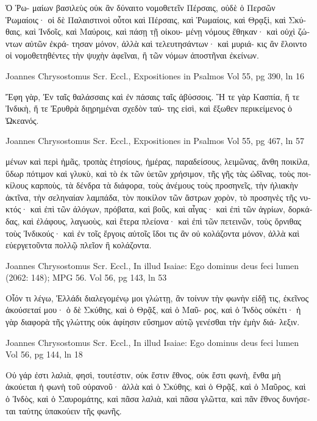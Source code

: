 \documentclass[12pt,letterpaper,twoside,final]{memoir}
\begin{document}
\begin{greek}
                                                Ὁ Ῥω-
μαίων βασιλεὺς οὐκ ἂν δύναιτο νομοθετεῖν Πέρσαις, 
οὐδὲ ὁ Περσῶν Ῥωμαίοις· οἱ δὲ Παλαιστινοὶ οὗτοι 
καὶ Πέρσαις, καὶ Ῥωμαίοις, καὶ Θρᾳξὶ, καὶ Σκύ-
θαις, καὶ Ἰνδοῖς, καὶ Μαύροις, καὶ πάσῃ τῇ οἰκου-
μένῃ νόμους ἔθηκαν· καὶ οὐχὶ ζώντων αὐτῶν ἐκρά-
τησαν μόνον, ἀλλὰ καὶ τελευτησάντων· καὶ μυριά-
κις ἂν ἕλοιντο οἱ νομοθετηθέντες τὴν ψυχὴν ἀφεῖναι, 
ἢ τῶν νόμων ἀποστῆναι ἐκείνων. 



Joannes Chrysostomus Scr. Eccl., Expositiones in Psalmos 
Vol 55, pg 390, ln 16

                  Ἔφη γὰρ, Ἐν ταῖς θαλάσσαις 
καὶ ἐν πάσαις ταῖς ἀβύσσοις. Ἥ τε γὰρ Κασπία, 
ἥ τε Ἰνδικὴ, ἥ τε Ἐρυθρὰ διῃρημέναι σχεδὸν ταύ-
της εἰσὶ, καὶ ἔξωθεν περικείμενος ὁ Ὠκεανός. 



Joannes Chrysostomus Scr. Eccl., Expositiones in Psalmos 
Vol 55, pg 467, ln 57

μένων καὶ περὶ ἡμᾶς, τροπὰς ἐτησίους, ἡμέρας, 
παραδείσους, λειμῶνας, ἄνθη ποικίλα, ὕδωρ πότιμον 
καὶ γλυκὺ, καὶ τὸ ἐκ τῶν ὑετῶν χρήσιμον, τῆς γῆς 
τὰς ὠδῖνας, τοὺς ποικίλους καρποὺς, τὰ δένδρα τὰ 
διάφορα, τοὺς ἀνέμους τοὺς προσηνεῖς, τὴν ἡλιακὴν 
ἀκτῖνα, τὴν σεληναίαν λαμπάδα, τὸν ποικίλον τῶν 
ἄστρων χορὸν, τὸ προσηνὲς τῆς νυκτός· καὶ ἐπὶ τῶν 
ἀλόγων, πρόβατα, καὶ βοῦς, καὶ αἶγας· καὶ ἐπὶ τῶν 
ἀγρίων, δορκάδας, καὶ ἐλάφους, λαγωοὺς, καὶ ἕτερα 
πλείονα· καὶ ἐπὶ τῶν πετεινῶν, τοὺς ὄρνιθας τοὺς 
Ἰνδικούς· καὶ ἐν τοῖς ἔργοις αὐτοῖς ἴδοι τις ἂν οὐ 
κολάζοντα μόνον, ἀλλὰ καὶ εὐεργετοῦντα πολλῷ    
πλεῖον ἢ κολάζοντα. 



Joannes Chrysostomus Scr. Eccl., In illud Isaiae: Ego dominus deus feci lumen (2062: 148); MPG 56.
Vol 56, pg 143, ln 53

              Οἷόν τι λέγω, Ἑλλάδι διαλεγομένῳ μοι 
γλώττῃ, ἂν τοίνυν τὴν φωνὴν εἰδῇ τις, ἐκεῖνος 
ἀκούσεταί μου· ὁ δὲ Σκύθης, καὶ ὁ Θρᾷξ, καὶ ὁ Μαῦ-
ρος, καὶ ὁ Ἰνδὸς οὐκέτι· ἡ γὰρ διαφορὰ τῆς γλώττης 
οὐκ ἀφίησιν εὔσημον αὐτῷ γενέσθαι τὴν ἐμὴν διά-
λεξιν. 



Joannes Chrysostomus Scr. Eccl., In illud Isaiae: Ego dominus deus feci lumen 
Vol 56, pg 144, ln 18

                                                       Οὐ 
γάρ ἐστι λαλιὰ, φησὶ, τουτέστιν, οὐκ ἔστιν ἔθνος, οὐκ 
ἔστι φωνὴ, ἔνθα μὴ ἀκούεται ἡ φωνὴ τοῦ οὐρανοῦ· 
ἀλλὰ καὶ ὁ Σκύθης, καὶ ὁ Θρᾷξ, καὶ ὁ Μαῦρος, καὶ ὁ 
Ἰνδὸς, καὶ ὁ Σαυρομάτης, καὶ πᾶσα λαλιὰ, καὶ πᾶσα 
γλῶττα, καὶ πᾶν ἔθνος δυνήσεται ταύτης ὑπακούειν 
τῆς φωνῆς. 




\end{greek}
\end{document}
